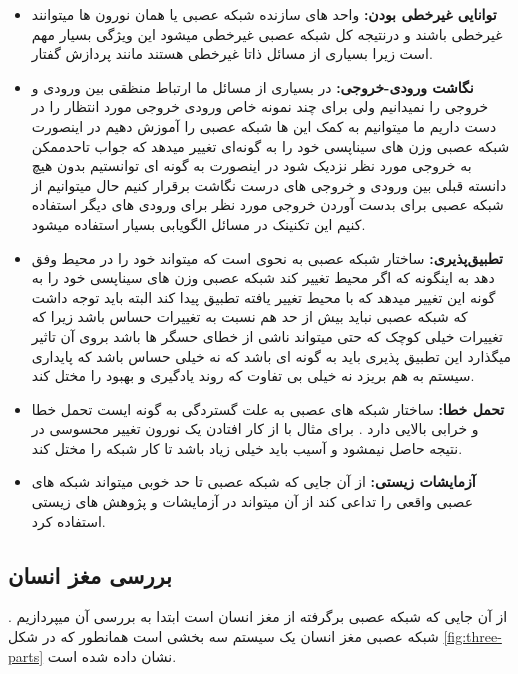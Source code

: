 \documentclass[11pt,a4paper,twocolumn]{article}
\begin{document}
\begin{itemize}
  \item 
\textbf{توانایی غیرخطی بودن:}
  واحد های سازنده شبکه عصبی یا همان نورون ها میتوانند غیرخطی باشند و درنتیجه کل شبکه عصبی غیرخطی میشود این ویژگی بسیار مهم است زیرا بسیاری از مسائل ذاتا غیرخطی هستند مانند پردازش گفتار.
  \item
\textbf{نگاشت ورودی-خروجی:}
در بسیاری از مسائل ما ارتباط منظقی بین ورودی و خروجی را نمیدانیم ولی برای چند نمونه خاص ورودی خروجی مورد انتظار را در دست داریم ما میتوانیم به کمک این ها شبکه عصبی را آموزش دهیم در اینصورت شبکه عصبی وزن های سیناپسی خود را به گونه‌ای تغییر میدهد که جواب تاحدممکن به خروجی مورد نظر نزدیک شود در اینصورت به گونه ای توانستیم بدون هیچ دانسته قبلی بین ورودی و خروجی های درست نگاشت برقرار کنیم حال میتوانیم از شبکه عصبی برای بدست آوردن خروجی مورد نظر برای ورودی های دیگر استفاده کنیم این تکنینک در مسائل الگویابی بسیار استفاده میشود.
\item
\textbf{تطبیق‌پذیری:}
ساختار شبکه عصبی به نحوی است که میتواند  خود را در محیط وفق دهد به اینگونه که اگر محیط تغییر کند شبکه عصبی وزن های سیناپسی خود را به گونه این تغییر میدهد که با محیط تغییر یافته تطبیق پیدا کند البته باید توجه داشت که شبکه عصبی نباید بیش از حد هم نسبت به تغییرات حساس باشد زیرا که تغییرات خیلی کوچک که حتی میتواند ناشی از خطای حسگر ها باشد بروی آن تاثیر میگذارد این تطبیق پذیری باید به گونه ای باشد که نه خیلی حساس باشد که پایداری سیستم به هم بریزد نه خیلی بی تفاوت که روند یادگیری و بهبود را مختل کند.
\item
\textbf{تحمل خطا:}
ساختار شبکه های عصبی به علت گستردگی به گونه ایست تحمل خطا و خرابی بالایی دارد . برای مثال با از کار افتادن یک نورون تغییر محسوسی در نتیجه حاصل نیمشود و آسیب باید خیلی زیاد باشد تا کار شبکه را مختل کند.
\item
\textbf{آزمایشات زیستی:}
از آن جایی که شبکه عصبی تا حد خوبی میتواند شبکه های عصبی واقعی را تداعی کند از آن میتواند در آزمایشات و پژوهش های زیستی استفاده کرد.
\end{itemize}

\subsection{بررسی مغز انسان}
از آن جایی که شبکه عصبی برگرفته از مغز انسان است ابتدا به بررسی آن میپردازیم . شبکه عصبی مغز انسان یک سیستم سه بخشی است همانطور که در شکل
\ref{fig:three-parts}
نشان داده شده است.
\end{document}
